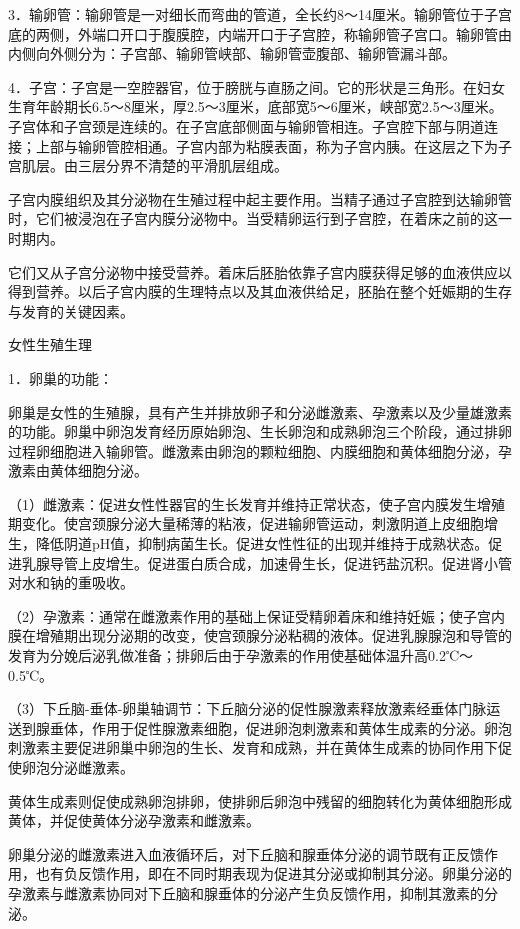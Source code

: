 \documentclass[12pt,UTF8]{ctexbook}
\begin{document}
3．输卵管：输卵管是一对细长而弯曲的管道，全长约8～14厘米。输卵管位于子宫底的两侧，外端口开口于腹膜腔，内端开口于子宫腔，称输卵管子宫口。输卵管由内侧向外侧分为：子宫部、输卵管峡部、输卵管壶腹部、输卵管漏斗部。

4．子宫：子宫是一空腔器官，位于膀胱与直肠之间。它的形状是三角形。在妇女生育年龄期长6.5～8厘米，厚2.5～3厘米，底部宽5～6厘米，峡部宽2.5～3厘米。子宫体和子宫颈是连续的。在子宫底部侧面与输卵管相连。子宫腔下部与阴道连接；上部与输卵管腔相通。子宫内部为粘膜表面，称为子宫内胰。在这层之下为子宫肌层。由三层分界不清楚的平滑肌层组成。

子宫内膜组织及其分泌物在生殖过程中起主要作用。当精子通过子宫腔到达输卵管时，它们被浸泡在子宫内膜分泌物中。当受精卵运行到子宫腔，在着床之前的这一时期内。

它们又从子宫分泌物中接受营养。着床后胚胎依靠子宫内膜获得足够的血液供应以得到营养。以后子宫内膜的生理特点以及其血液供给足，胚胎在整个妊娠期的生存与发育的关键因素。

女性生殖生理

1．卵巢的功能：

卵巢是女性的生殖腺，具有产生并排放卵子和分泌雌激素、孕激素以及少量雄激素的功能。卵巢中卵泡发育经历原始卵泡、生长卵泡和成熟卵泡三个阶段，通过排卵过程卵细胞进入输卵管。雌激素由卵泡的颗粒细胞、内膜细胞和黄体细胞分泌，孕激素由黄体细胞分泌。

（1）雌激素：促进女性性器官的生长发育并维持正常状态，使子宫内膜发生增殖期变化。使宫颈腺分泌大量稀薄的粘液，促进输卵管运动，刺激阴道上皮细胞增生，降低阴道pH值，抑制病菌生长。促进女性性征的出现并维持于成熟状态。促进乳腺导管上皮增生。促进蛋白质合成，加速骨生长，促进钙盐沉积。促进肾小管对水和钠的重吸收。

（2）孕激素：通常在雌激素作用的基础上保证受精卵着床和维持妊娠；使子宫内膜在增殖期出现分泌期的改变，使宫颈腺分泌粘稠的液体。促进乳腺腺泡和导管的发育为分娩后泌乳做准备；排卵后由于孕激素的作用使基础体温升高0.2℃～0.5℃。

（3）下丘脑-垂体-卵巢轴调节：下丘脑分泌的促性腺激素释放激素经垂体门脉运送到腺垂体，作用于促性腺激素细胞，促进卵泡刺激素和黄体生成素的分泌。卵泡刺激素主要促进卵巢中卵泡的生长、发育和成熟，并在黄体生成素的协同作用下促使卵泡分泌雌激素。

黄体生成素则促使成熟卵泡排卵，使排卵后卵泡中残留的细胞转化为黄体细胞形成黄体，并促使黄体分泌孕激素和雌激素。

卵巢分泌的雌激素进入血液循环后，对下丘脑和腺垂体分泌的调节既有正反馈作用，也有负反馈作用，即在不同时期表现为促进其分泌或抑制其分泌。卵巢分泌的孕激素与雌激素协同对下丘脑和腺垂体的分泌产生负反馈作用，抑制其激素的分泌。
\end{document}
